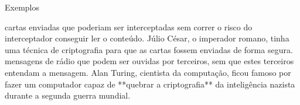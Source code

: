 \begin{frame}{}{}
\end{frame}





\begin{frame}{Exemplos}{}
\begin{itemize}

\pitem cartas enviadas que poderiam ser interceptadas sem correr o risco do interceptador conseguir ler o conteúdo. Júlio César, o imperador romano, tinha uma técnica de criptografia para que as cartas fossem enviadas de forma segura.
\pitem mensagens de rádio que podem ser ouvidas por terceiros, sem que estes terceiros entendam a mensagem. Alan Turing, cientista da computação, ficou famoso por fazer um computador capaz de **quebrar a criptografia** da inteligência nazista durante a segunda guerra mundial.

\end{itemize}
\end{frame}



